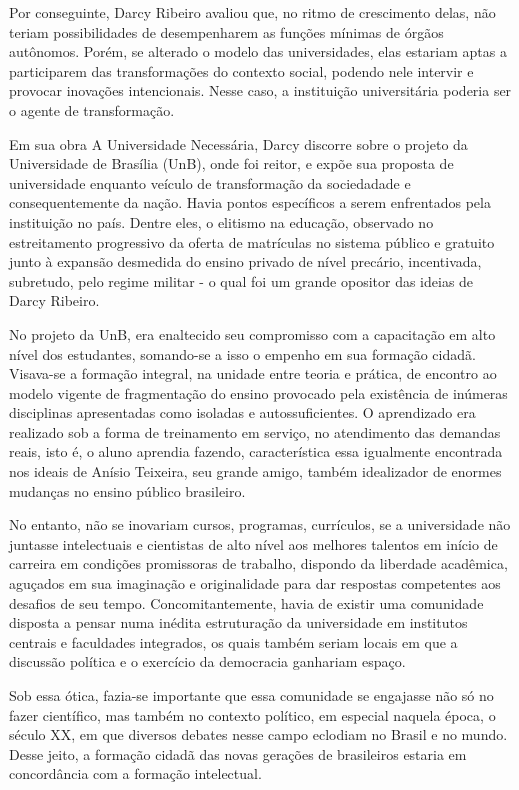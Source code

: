 \documentclass{sbrt}
\begin{document}
Por conseguinte, Darcy Ribeiro avaliou que, no ritmo de crescimento delas, não teriam possibilidades de desempenharem as funções mínimas de órgãos autônomos. Porém, se alterado o modelo das universidades, elas estariam aptas a participarem das transformações do contexto social, podendo nele intervir e provocar inovações intencionais. Nesse caso, a instituição universitária poderia ser o agente de transformação.

Em sua obra A Universidade Necessária, Darcy discorre sobre o projeto da Universidade de Brasília (UnB), onde foi reitor, e expõe sua proposta de universidade enquanto veículo de transformação da sociedadade e consequentemente da nação. Havia pontos específicos a serem enfrentados pela instituição no país. Dentre eles, o elitismo na educação, observado no estreitamento progressivo da oferta de matrículas no sistema público e gratuito junto à expansão desmedida do ensino privado de nível precário, incentivada, subretudo, pelo regime militar - o qual foi um grande opositor das ideias de Darcy Ribeiro.

No projeto da UnB, era enaltecido seu compromisso com a capacitação em alto nível dos estudantes, somando-se a isso o empenho em sua formação cidadã. Visava-se a formação integral, na unidade entre teoria e prática, de encontro ao modelo vigente de fragmentação do ensino provocado pela existência de inúmeras disciplinas apresentadas como isoladas e autossuficientes. O aprendizado era realizado sob a forma de treinamento em serviço, no atendimento das demandas reais, isto é, o aluno aprendia fazendo, característica essa igualmente encontrada nos ideais de Anísio Teixeira, seu grande amigo, também idealizador de enormes mudanças no ensino público brasileiro.

No entanto, não se inovariam cursos, programas, currículos, se a universidade não juntasse intelectuais e cientistas de alto nível aos melhores talentos em início de carreira em condições promissoras de trabalho, dispondo da liberdade acadêmica, aguçados em sua imaginação e originalidade para dar respostas competentes aos desafios de seu tempo. Concomitantemente, havia de existir uma comunidade disposta a pensar numa inédita estruturação da universidade em institutos centrais e faculdades integrados, os quais também seriam locais em que a discussão política e o exercício da democracia ganhariam espaço.

Sob essa ótica, fazia-se importante que essa comunidade se engajasse não só no fazer científico, mas também no contexto político, em especial naquela época, o século XX, em que diversos debates nesse campo eclodiam no Brasil e no mundo. Desse jeito, a formação cidadã das novas gerações de brasileiros estaria em concordância com a formação intelectual.
\end{document}
